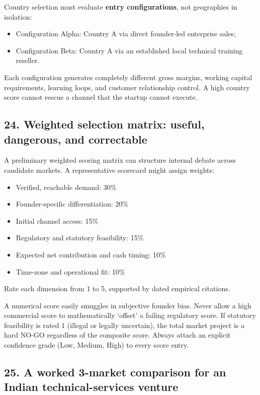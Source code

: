 Country selection must evaluate \textbf{entry configurations}, not geographies in isolation:
\begin{itemize}
    \item Configuration Alpha: Country A via direct founder-led enterprise sales;
    \item Configuration Beta: Country A via an established local technical training reseller.
\end{itemize}
Each configuration generates completely different gross margins, working capital requirements, learning loops, and customer relationship control. A high country score cannot rescue a channel that the startup cannot execute.

\subsection{24. Weighted selection matrix: useful, dangerous, and correctable}

A preliminary weighted scoring matrix can structure internal debate across candidate markets. A representative scorecard might assign weights:
\begin{itemize}
    \item Verified, reachable demand: 30\%
    \item Founder-specific differentiation: 20\%
    \item Initial channel access: 15\%
    \item Regulatory and statutory feasibility: 15\%
    \item Expected net contribution and cash timing: 10\%
    \item Time-zone and operational fit: 10\%
\end{itemize}
Rate each dimension from 1 to 5, supported by dated empirical citations.

\begin{tcolorbox}[colback=BayesCanvas,colframe=BayesSecondary,arc=1mm,title=\textbf{Warning: The Weighted Score Fallacy}]
A numerical score easily smuggles in subjective founder bias. Never allow a high commercial score to mathematically `offset' a failing regulatory score. If statutory feasibility is rated 1 (illegal or legally uncertain), the total market project is a hard NO-GO regardless of the composite score. Always attach an explicit confidence grade (Low, Medium, High) to every score entry.
\end{tcolorbox}

\subsection{25. A worked 3-market comparison for an Indian technical-services venture}

